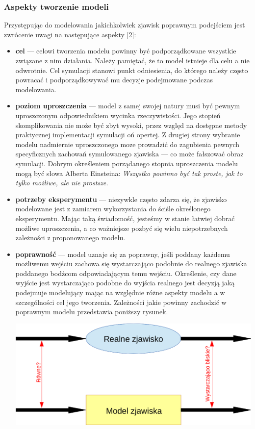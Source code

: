 \subsubsection{Aspekty tworzenie modeli}
\par{
Przystępując do modelowania jakichkolwiek zjawisk poprawnym podejściem jest zwrócenie uwagi na następujące aspekty [2]:
\begin{itemize}
\item \textbf{cel} --- celowi tworzenia modelu powinny być podporządkowane wszystkie związane z nim działania. Należy pamiętać, że to model istnieje dla celu a nie odwrotnie. Cel symulacji stanowi punkt odniesienia, do którego należy często powracać i podporządkowywać mu decyzje podejmowane podczas modelowania.
\item \textbf{poziom uproszczenia} --- model z samej swojej natury musi być pewnym uproszczonym odpowiednikiem wycinka rzeczywistości. Jego stopień skomplikowania nie może być zbyt wysoki, przez względ na dostępne metody praktycznej implementacji symulacji oń opertej. Z drugiej strony wybranie modelu nadmiernie uproszczonego moze prowadzić do zagubienia pewnych specyficznych zachowań symulowanego zjawiska --- co może fałszować obraz symulacji. Dobrym określeniem porządanego stopnia uproszczenia modelu mogą być słowa Alberta Einsteina: \textit{Wszys­tko po­win­no być tak pros­te, jak to tyl­ko możli­we, ale nie pros­tsze.}
\item \textbf{potrzeby eksperymentu} --- niezywkle często zdarza się, że zjawisko modelowane jest z zamiarem wykorzystania do ściśle określonego eksperymentu. Mając taką świadomość, jesteśmy w stanie łatwiej dobrać możliwe uproszczenia, a co ważniejsze pozbyć się wielu niepotrzebnych zależności z proponowanego modelu.
\item \textbf{poprawność} --- model uznaje się za poprawny, jeśli poddany każdemu możliwemu wejściu zachowa się wystarczająco podobnie do realnego zjawiska poddanego bodźcom odpowiadającym temu wejściu. Określenie, czy dane wyjście jest wystarczająco podobne do wyjścia realnego jest decyzją jaką podejmuje modelujący mając na względnie różne aspekty modelu a w szczególności cel jego tworzenia. Zależności jakie powinny zachodzić w poprawnym modelu przedstawia poniższy rysunek.
\par{
\begin{center}
\includegraphics[width=\textwidth,keepaspectratio]{img/poprawnosc_modelu}

\end{center}}
\end{itemize}}
